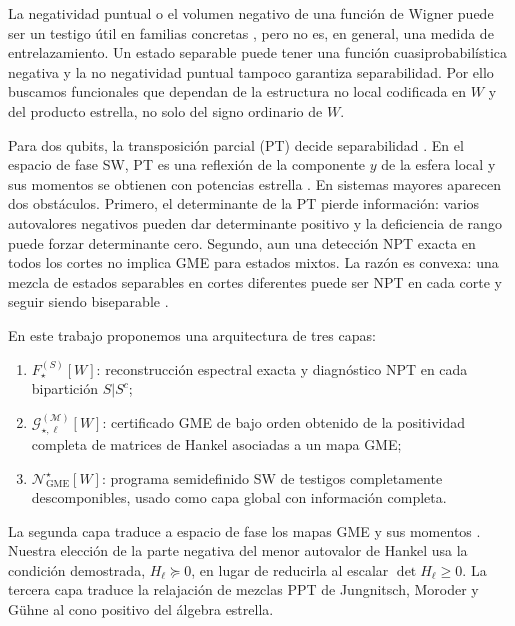 \documentclass[11pt,a4paper]{article}
\theoremstyle{definition}
\begin{document}
La negatividad puntual o el volumen negativo de una función de Wigner puede ser
un testigo útil en familias concretas \cite{Arkhipov2018NegativityVolume}, pero no
es, en general, una medida de entrelazamiento. Un estado separable puede tener
una función cuasiprobabilística negativa y la no negatividad puntual tampoco
garantiza separabilidad. Por ello buscamos funcionales que dependan de la
estructura no local codificada en $W$ y del producto estrella, no solo del signo
ordinario de $W$.

Para dos qubits, la transposición parcial (PT) decide separabilidad
\cite{Peres1996Separability,Horodecki1996Separability}. En el espacio de fase SW,
PT es una reflexión de la componente $y$ de la esfera local y sus momentos se
obtienen con potencias estrella
\cite{Elben2020PTMoments,YuGuehne2021Hankel,Zhang2022PTMoments}. En sistemas
mayores aparecen dos obstáculos.
Primero, el determinante de la PT pierde información: varios autovalores
negativos pueden dar determinante positivo y la deficiencia de rango puede
forzar determinante cero. Segundo, aun una detección NPT exacta en todos los
cortes no implica GME para estados mixtos. La razón es convexa: una mezcla de
estados separables en cortes diferentes puede ser NPT en cada corte y seguir
siendo biseparable \cite{GuhneToth2009Review,Jungnitsch2011PPTMixtures}.

En este trabajo proponemos una arquitectura de tres capas:
\begin{enumerate}
\item $F_{\star}^{(S)}[W]$: reconstrucción espectral exacta y diagnóstico NPT en
cada bipartición $S|S^c$;
\item $\mathcal G_{\star,\ell}^{(\mathcal M)}[W]$: certificado GME de bajo orden
obtenido de la positividad completa de matrices de Hankel asociadas a un mapa
GME;
\item $\mathcal N_{\mathrm{GME}}^{\star}[W]$: programa semidefinido SW de
testigos completamente descomponibles, usado como capa global con información
completa.
\end{enumerate}
La segunda capa traduce a espacio de fase los mapas GME y sus momentos
\cite{HuberSengupta2014PositiveMaps,Clivaz2017GMEMaps,
Mukherjee2025GMEMoments}. Nuestra elección de la parte negativa del menor
autovalor de Hankel usa la condición demostrada, $H_\ell\succeq0$, en lugar de
reducirla al escalar $\det H_\ell\geq0$. La tercera capa traduce la relajación de
mezclas PPT de Jungnitsch, Moroder y Gühne \cite{Jungnitsch2011PPTMixtures} al
cono positivo del álgebra estrella.
\end{document}
